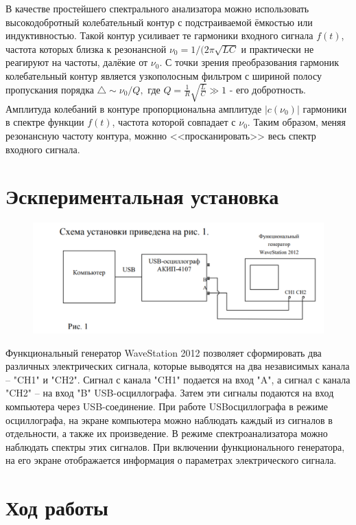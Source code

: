 \documentclass[a4paper, 12pt]{article}%
\begin{document}
В качестве простейшего спектрального анализатора можно использовать высокодобротный колебательный контур с подстраиваемой ёмкостью или индуктивностью. Такой контур усиливает те гармоники входного сигнала $f(t)$, частота которых близка к резонансной $\nu_0 = 1/(2\pi \sqrt{LC}$ и практически не реагируют на частоты, далёкие от $\nu_0$. С точки зрения преобразования гармоник колебательный контур является узкополосным фильтром с шириной полосу пропускания порядка $\bigtriangleup \sim \nu_0/Q,$ где $Q = \frac{1}{R}\sqrt{\frac{L}{C}} \gg 1$ - его добротность. Амплитуда колебаний в контуре пропорциональна амплитуде $|c(\nu_0)|$ гармоники в спектре функции $f(t)$, частота которой совпадает с $\nu_0$. Таким образом, меняя резонансную частоту контура, можнно <<просканировать>> весь спектр входного сигнала.

\section*{Эскпериментальная установка}

\begin{figure}[h!]
\centering
\includegraphics[scale=0.6]{images/scheme.png}
\label{fig:Image1}
\end{figure}

Функциональный генератор WaveStation 2012 позволяет сформировать два
различных электрических сигнала, которые выводятся на два независимых
канала – "CH1" и "CH2". Сигнал с канала "CH1" подается на вход "A", а
сигнал с канала "CH2" – на вход "B" USB-осциллографа. Затем эти сигналы подаются на вход компьютера через USB-соединение. При работе USBосциллографа в режиме осциллографа, на экране компьютера можно
наблюдать каждый из сигналов в отдельности, а также их произведение.
В режиме спектроанализатора можно наблюдать спектры этих сигналов. При включении функционального генератора, на его экране отображается информация о параметрах электрического сигнала.

\section*{Ход работы}
\end{document}
